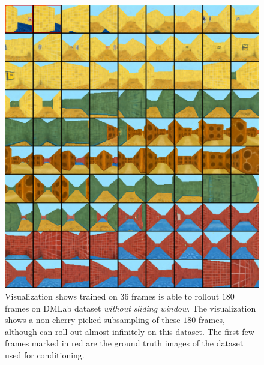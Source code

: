 \begin{figure}[h]
    \centering
    \includegraphics[width=\textwidth]{figures/appendix_vis/df_dmlab_long_0.png}
    \caption{Visualization shows \algo{} trained on $36$ frames is able to rollout $180$ frames on DMLab dataset \emph{without sliding window}. The visualization shows a non-cherry-picked subsampling of these $180$ frames, although \algo{} can roll out almost infinitely on this dataset. The first few frames marked in red are the ground truth images of the dataset used for conditioning.}
    \label{fig:dmlab_long_0}
\end{figure}
